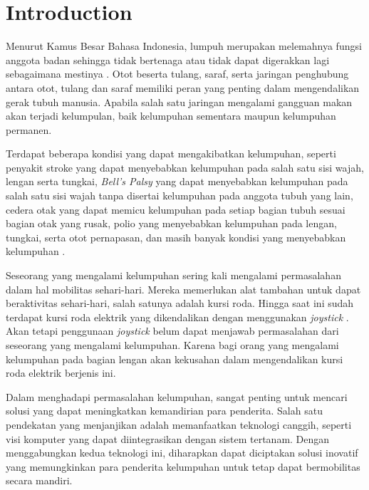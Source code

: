 \section{Introduction}
\label{sec:pendahuluan}


Menurut Kamus Besar Bahasa Indonesia, lumpuh merupakan melemahnya fungsi anggota badan sehingga tidak bertenaga atau tidak dapat digerakkan lagi sebagaimana mestinya \cite{Daring_2016}. Otot beserta tulang, saraf, serta jaringan penghubung antara otot, tulang dan saraf memiliki peran yang penting dalam mengendalikan gerak tubuh manusia. Apabila salah satu jaringan mengalami gangguan makan akan terjadi kelumpulan, baik kelumpuhan sementara maupun kelumpuhan permanen.

Terdapat beberapa kondisi yang dapat mengakibatkan kelumpuhan, seperti penyakit stroke yang dapat menyebabkan kelumpuhan pada salah satu sisi wajah, lengan serta tungkai, \emph{Bell's Palsy} yang dapat menyebabkan kelumpuhan pada salah satu sisi wajah tanpa disertai kelumpuhan pada anggota tubuh yang lain, cedera otak yang dapat memicu kelumpuhan pada setiap bagian tubuh sesuai bagian otak yang rusak, polio yang menyebabkan kelumpuhan pada lengan, tungkai, serta otot pernapasan, dan masih banyak kondisi yang menyebabkan kelumpuhan \cite{Pansawira_2022}.

Seseorang yang mengalami kelumpuhan sering kali mengalami permasalahan dalam hal mobilitas sehari-hari. Mereka memerlukan alat tambahan untuk dapat beraktivitas sehari-hari, salah satunya adalah kursi roda. Hingga saat ini sudah terdapat kursi roda elektrik yang dikendalikan dengan menggunakan \emph{joystick} \cite{choi2019motion}. Akan tetapi penggunaan \emph{joystick} belum dapat menjawab permasalahan dari seseorang yang mengalami kelumpuhan. Karena bagi orang yang mengalami kelumpuhan pada bagian lengan akan kekusahan dalam mengendalikan kursi roda elektrik berjenis ini.

Dalam menghadapi permasalahan kelumpuhan, sangat penting untuk mencari solusi yang dapat meningkatkan kemandirian para penderita. Salah satu pendekatan yang menjanjikan adalah memanfaatkan teknologi canggih, seperti visi komputer yang dapat diintegrasikan dengan sistem tertanam. Dengan menggabungkan kedua teknologi ini, diharapkan dapat diciptakan solusi inovatif yang memungkinkan para penderita kelumpuhan untuk tetap dapat bermobilitas secara mandiri.

